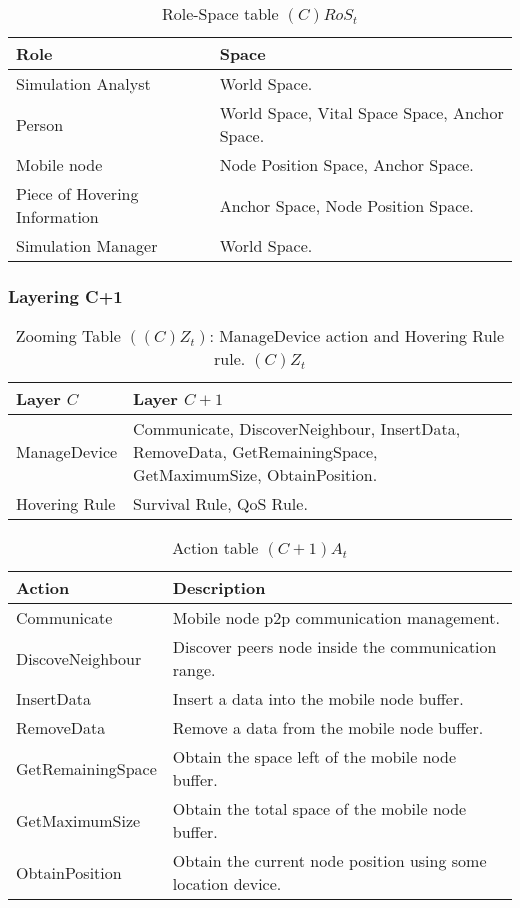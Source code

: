 \begin{table}[H]
	\centering
	\begin{tabular}{|p{4cm}|p{8cm}|}
			\hline
			\textbf{Role} & \textbf{Space} \\
			\hline
			Simulation Analyst & World Space. \\
			\hline
			Person & World Space, Vital Space Space, Anchor Space. \\
			\hline
			Mobile node & Node Position Space, Anchor Space. \\
			\hline
			Piece of Hovering Information & Anchor Space, Node Position Space. \\
			\hline
			Simulation Manager & World Space. \\
			\hline
		\end{tabular}
	\caption{Role-Space table $(C)RoS_t$}
	\label{tab:cost}
\end{table}

\subsubsection{Layering C+1}

\begin{table}[H]
	\centering
	\begin{tabular}{|p{4cm}|p{8cm}|}
			\hline
			\textbf{Layer $C$} & \textbf{Layer $C+1$} \\
			\hline
			ManageDevice & Communicate, DiscoverNeighbour, InsertData,
			RemoveData, GetRemainingSpace, GetMaximumSize, ObtainPosition. \\
			\hline
			Hovering Rule & Survival Rule, QoS Rule. \\	
			\hline
		\end{tabular}
	\caption{Zooming Table $\left( \left( C \right)Z_t \right)$: ManageDevice action and Hovering Rule rule. $(C)Z_t$}
	\label{tab:czt}
\end{table}

\begin{table}[H]
	\centering
	\begin{tabular}{|p{4cm}|p{8cm}|}
			\hline
			\textbf{Action} & \textbf{Description} \\
			\hline
			Communicate & Mobile node p2p communication management.\\
			\hline
			DiscoveNeighbour & Discover peers node inside the communication range. \\
			\hline
			InsertData & Insert a data into the mobile node buffer. \\
			\hline
			RemoveData & Remove a data from the mobile node buffer. \\
			\hline
			GetRemainingSpace & Obtain the space left of the mobile node buffer. \\
			\hline
			GetMaximumSize & Obtain the total space of the mobile node buffer. \\
			\hline
			ObtainPosition & Obtain the current node position using some location device. \\
			\hline
		\end{tabular}
	\caption{Action table $(C+1)A_t$}
	\label{tab:cp1at}
\end{table}

